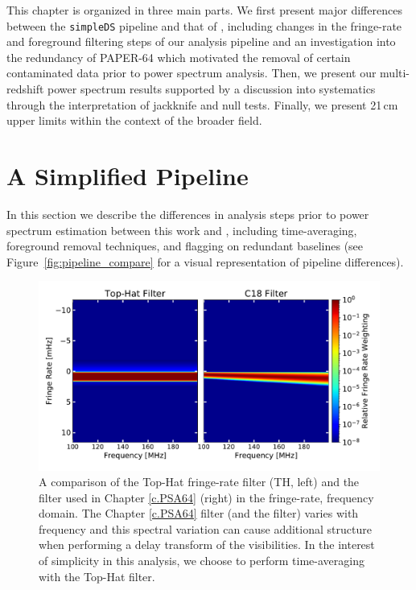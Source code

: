 This chapter is organized in three main parts. We first present major differences between the \texttt{simpleDS} pipeline and that of , including changes in the fringe-rate and foreground filtering steps of our analysis pipeline and an investigation into the redundancy of PAPER-64 which motivated the removal of certain contaminated data prior to power spectrum analysis. Then, we present our multi-redshift power spectrum results supported by a discussion into systematics through the interpretation of jackknife and null tests. Finally, we present 21\,cm upper limits within the context of the broader field. 

\section{A Simplified Pipeline}

In this section we describe the differences in analysis steps prior to power spectrum estimation
 between this work and , including time-averaging, foreground removal techniques, and flagging on redundant baselines (see Figure~\ref{fig:pipeline_compare} for a visual representation of pipeline differences).

\begin{figure}
\centering
\includegraphics[width=.85\textwidth]{plots/frf_comparison_waterfall.pdf}
\caption{A comparison of the Top-Hat fringe-rate filter (TH, left) and the filter used in Chapter \ref{c.PSA64} (right) in the fringe-rate, frequency domain.
The Chapter \ref{c.PSA64} filter (and the \citet{ali_et_al2015} filter)
varies with frequency and this spectral
variation can cause additional structure
when performing a delay transform of the visibilities. In the interest of simplicity
in this analysis, we choose to perform time-averaging with the
Top-Hat filter.
}\label{fig:FRF_response}
\end{figure}


